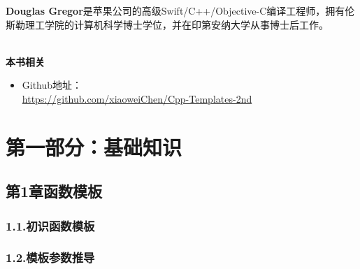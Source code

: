 \documentclass[11pt,a4paper,UTF8]{book}
\begin{document}
\begin{sloppypar}
	\textbf{Douglas Gregor}是苹果公司的高级Swift/C++/Objective-C编译工程师，拥有伦斯勒理工学院的计算机科学博士学位，并在印第安纳大学从事博士后工作。
	
	\hspace*{\fill} \\ %
	\noindent\textbf{本书相关}
	\begin{itemize}
		\item Github地址：\\\url{https://github.com/xiaoweiChen/Cpp-Templates-2nd}
	\end{itemize}
	\newpage
	
	\pagestyle{empty}
	
	\newpage
	
	\pagestyle{empty}
	
	\newpage
	
	\pagestyle{empty}
	
	\newpage
	
	\pagestyle{empty}
	
	\newpage
	
	\tableofcontents
	\newpage

	
	\color{white}
	\section*{第一部分：基础知识}
	\pagecolor{mygray}
	\textbf{}
	\newpage
	\color{black}
	\pagecolor{white}

	\subsection*{ 第1章\hspace{0.5cm}函数模板}
	
	
	\subsubsection*{ 1.1.\hspace{0.2cm}初识函数模板}
	
	
	\subsubsection*{ 1.2.\hspace{0.2cm}模板参数推导}
	
	

\end{sloppypar}
\end{document}
